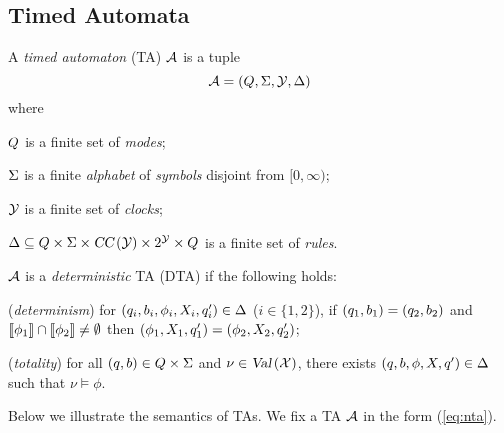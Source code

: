 \subsection{Timed Automata}
\vspace{-0.6em}
\begin{definition}
A \emph{timed automaton} (TA)
$\mathcal{A}$ is a tuple
\begin{equation}\label{eq:nta}
\mathcal{A}=(Q,\Sigma,\mathcal{Y},\Delta)
\end{equation}
where
\begin{compactitem}
\item $Q$ is a finite set of \emph{modes}; %
\item $\Sigma$ is a finite \emph{alphabet} of \emph{symbols} disjoint from $[0,\infty)$;
\item $\mathcal{Y}$ is a finite set of \emph{clocks};
\item $\Delta\subseteq Q\times\Sigma\times\mbox{\sl CC}\left(\mathcal{Y}\right)\times 2^{\mathcal{Y}}\times Q$ is a finite set of \emph{rules}.
\end{compactitem}
$\mathcal{A}$ is a \emph{deterministic} TA (DTA) if the following holds:
\begin{compactenum}
\item ({\em determinism}) for $(q_i,b_i,\phi_i,X_i,q'_i)\in\Delta$ ($i\in\{1,2\}$), if $(q_1,b_1)=(q_2,b_2)$ and ${\llbracket}{\phi_1}{\rrbracket}\cap {\llbracket}{\phi_2}{\rrbracket}\ne\emptyset$ then $(\phi_1,X_1,q'_1)=(\phi_2,X_2,q'_2)$;
\item ({\em totality}) for all $(q,b)\in Q\times\Sigma$ and $\nu\in\mbox{\sl Val}\left(\mathcal{X}\right)$, there exists $(q,b,\phi,X,q')\in\Delta$ such that $\nu\models \phi$.
\end{compactenum}
\end{definition}
Below we illustrate the semantics of TAs. We fix a TA $\mathcal{A}$ in the form (\ref{eq:nta}).



